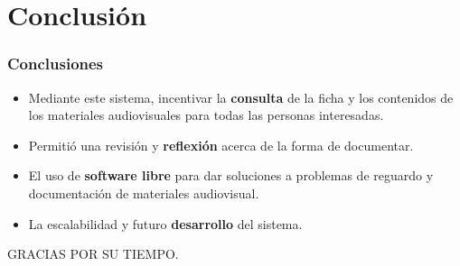 \documentclass{beamer}
\begin{document}
\section{Conclusión}
\begin{frame}
	\frametitle{Conclusiones}
	\begin{itemize}
		\item Mediante este sistema, incentivar la \textbf{consulta} de la ficha y los contenidos de los materiales audiovisuales para todas las personas interesadas.
		\item Permitió una revisión y \textbf{reflexión} acerca de la forma de documentar.
		\item El uso de \textbf{software libre} para dar soluciones a problemas de reguardo y documentación de materiales audiovisual.
		\item La escalabilidad y futuro \textbf{desarrollo} del sistema.
	\end{itemize}
\end{frame}

\begin{frame}
	\begin{center}
		GRACIAS POR SU TIEMPO.
		
	\end{center}
\end{frame}
\end{document}
